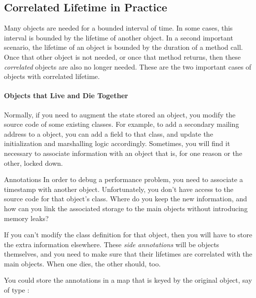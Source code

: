 
\subsection{Correlated Lifetime in Practice}

Many objects are needed for a bounded interval of time. In some cases, this
interval is bounded by the lifetime of another object. In a second important
scenario, the lifetime of an object is bounded by the duration of a method call.
Once that other object is not needed, or once that method returns, then these
\emph{correlated} objects are also no longer needed. These are the two important
cases of objects with correlated lifetime.

\paragraph{Objects that Live and Die Together}
\label{sec:correlated-lifetime-1}

Normally, if you need to augment the state stored an object, you modify
the source code of some existing classes. For example, to add a secondary
mailing address to a  object, you can add a field to that class, and update the
initialization and marshalling logic accordingly. Sometimes, you will find it
necessary to associate information with an object that is, for one reason or the
other, locked down.

\begin{example}{Annotations}
In order to debug a performance problem, you need to associate a timestamp with
another object. Unfortunately, you don't have access to the source code for
that object's class. Where do you keep the new information, and how can you
link the associated storage to the main objects without introducing memory
leaks?
\end{example}

If you can't modify the class definition for that object, then you will have to
store the extra information elsewhere. These \emph{side annotations} will be objects themselves, and you need to make sure that their
lifetimes are correlated with the main objects. When one dies, the other
should, too.

You could store the annotations in a map that is keyed by the
original object, say of type :

